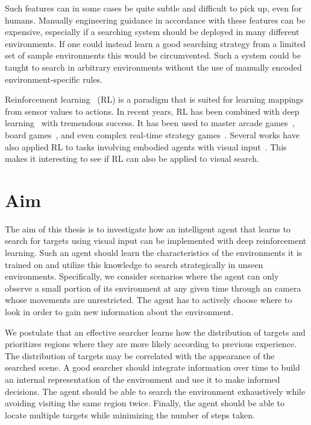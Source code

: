 Such features can in some cases be quite subtle and difficult to pick up, even for humans.
Manually engineering guidance in accordance with these features can be expensive,
especially if a searching system should be deployed in many different environments.
If one could instead learn a good searching strategy from a limited set of sample environments this would be circumvented.
Such a system could be taught to search in arbitrary environments without the use of manually encoded environment-specific rules.

Reinforcement learning~\cite{sutton_reinforcement_2018} (RL) is a paradigm that is suited for learning mappings from sensor values to actions.
In recent years, RL has been combined with deep learning~\cite{goodfellow_deep_2016} with tremendous success.
It has been used to master arcade games~\cite{mnih_human_2015}, board games~\cite{silver_alphago_2016}, and even complex real-time strategy games~\cite{vinyals_alphastar_2019}.
Several works have also applied RL to tasks involving embodied agents with visual input~\cite{minut_mahadevan_2001,mnih_attention_2014,zhu_target_2016,mirowski_navigate_2017}.
This makes it interesting to see if RL can also be applied to visual search.

\section{Aim}
\label{sec:aim}

The aim of this thesis is to investigate how an intelligent agent that learns to search for targets using visual input can be implemented with deep reinforcement learning.
Such an agent should learn the characteristics of the environments it is trained on and utilize this knowledge to search strategically in unseen environments.
Specifically, we consider scenarios where the agent can only observe a small portion of its environment at any given time through an camera whose movements are unrestricted.
The agent has to actively choose where to look in order to gain new information about the environment.

We postulate that an effective searcher learns how the distribution of targets and prioritizes regions where they are more likely according to previous experience.
The distribution of targets may be correlated with the appearance of the searched scene.
A good searcher should integrate information over time to build an internal representation of the environment and use it to make informed decisions.
The agent should be able to search the environment exhaustively while avoiding visiting the same region twice.
Finally, the agent should be able to locate multiple targets while minimizing the number of steps taken.

